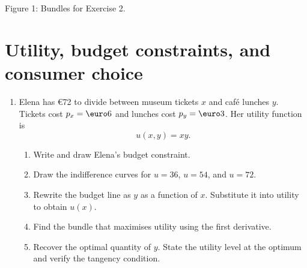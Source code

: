 \documentclass[11pt,a4paper]{article}
\begin{document}
\begin{center}

  {\small Figure 1: Bundles for Exercise 2.}
\end{center}

\section{Utility, budget constraints, and consumer choice}

\begin{enumerate}[label=\textbf{3.\alph*}]
  \item Elena has \euro72 to divide between museum tickets \(x\) and caf\'e
  lunches \(y\). Tickets cost \(p_x=\text{\euro}6\) and lunches cost
  \(p_y=\text{\euro}3\). Her utility function is
  \[
    u(x,y)=xy.
  \]
  \begin{enumerate}[label=(\roman*)]
    \item Write and draw Elena's budget constraint.
    \item Draw the indifference curves for \(u=36\), \(u=54\), and \(u=72\).
    \item Rewrite the budget line as \(y\) as a function of \(x\). Substitute
    it into utility to obtain \(u(x)\).
    \item Find the bundle that maximises utility using the first derivative.
    \item Recover the optimal quantity of \(y\). State the utility level at
    the optimum and verify the tangency condition.
  \end{enumerate}
\end{enumerate}
\end{document}
